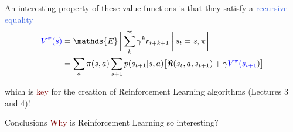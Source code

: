 \documentclass{beamer}
\begin{document}
\begin{frame}
	An interesting property of these value functions is that they satisfy a \textcolor{RoyalBlue}{recursive equality}
		\begin{align*}
		\textcolor{blue}{V^{\pi}(s)} & = \mathds{E} \bigg[\sum_{k}^{\infty}\gamma^{k} r_{t+k+1} \: \bigg| \: s_t=s,\pi \bigg] \\
			   & = \sum_a \pi(s,a) \sum_{s+1} p(s_{t+1}|s,a)\big[\Re(s_t, a, s_{t+1}) + \gamma \textcolor{blue}{V^{\pi}(s_{t+1}}) \big] 
		\end{align*}

	which is \textcolor{Maroon}{key} for the creation of Reinforcement Learning algorithms (Lectures 3 and 4)!
\end{frame}




\begin{frame}{Conclusions}
	\textcolor{Maroon}{Why} is Reinforcement Learning so interesting?
\end{frame}
\end{document}
